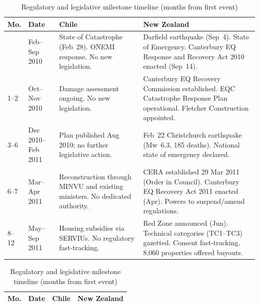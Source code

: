 \begin{table}[!htbp]
\centering
\caption{Regulatory and legislative milestone timeline (months from first event)}
\label{tab:regmilestones}
\footnotesize
\begin{tabular}{@{}
  >{\raggedright\arraybackslash}p{}
  >{\raggedright\arraybackslash}p{}
  >{\raggedright\arraybackslash}p{}
  >{\raggedright\arraybackslash}p{}
@{}}
\toprule
\textbf{Mo.} &
\textbf{Date} &
\textbf{Chile} &
\textbf{New Zealand} \\
\midrule

{0} & Feb--Sep 2010 &
State of Catastrophe (Feb~28). ONEMI response. No new legislation. &
Darfield earthquake (Sep~4). State of Emergency. Canterbury EQ Response and Recovery Act 2010 enacted (Sep~14). \\
\addlinespace

{1--2} & Oct--Nov 2010 &
Damage assessment ongoing. No new legislation. &
Canterbury EQ Recovery Commission established. EQC Catastrophe Response Plan operational. Fletcher Construction appointed. \\
\addlinespace

{3--6} & Dec 2010--Feb 2011 &
Plan published Aug 2010; no further legislative action. &
Feb~22 Christchurch earthquake (Mw~6.3, 185 deaths). National state of emergency declared. \\
\addlinespace

{6--7} & Mar--Apr 2011 &
Reconstruction through MINVU and existing ministers. No dedicated authority. &
CERA established 29 Mar 2011 (Order in Council). Canterbury EQ Recovery Act 2011 enacted (Apr). Powers to suspend/amend regulations. \\
\addlinespace

{8--12} & May--Sep 2011 &
Housing subsidies via SERVIUs. No regulatory fast-tracking. &
Red Zone announced (Jun). Technical categories (TC1--TC3) gazetted. Consent fast-tracking. 8,060 properties offered buyouts. \\

\end{tabular}

\centering
\footnotesize
\begin{tabular}{@{}
  >{\raggedright\arraybackslash}p{}
  >{\raggedright\arraybackslash}p{}
  >{\raggedright\arraybackslash}p{}
  >{\raggedright\arraybackslash}p{}
@{}}
\toprule
\textbf{Mo.} &
\textbf{Date} &
\textbf{Chile} &
\textbf{New Zealand} \\
\midrule


\end{tabular}
\end{table}
